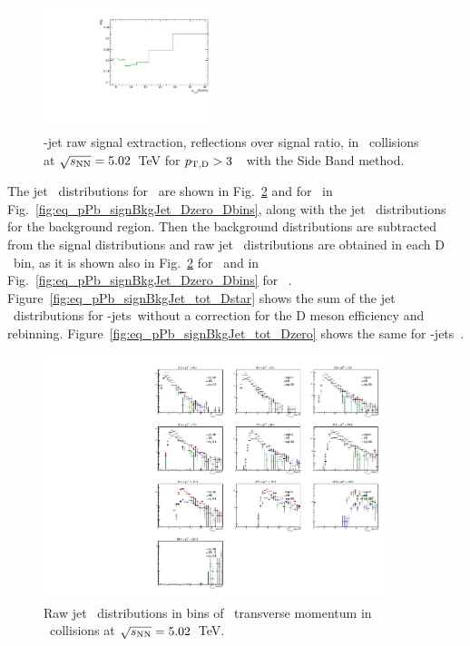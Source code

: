 \begin{figure}[bth]
\centering
\includegraphics[width=0.45\textwidth]{pPbplotsD0/Default/signalExtraction/plots/RefOverS_LHC16R03_pTD3.pdf}
\caption{\Dzero-jet raw signal extraction, reflections over signal ratio, in \pPb\ collisions at $\sqrt{s_{\rm NN}}=5.02$~TeV for $p_{\mathrm{T,D}}>3$~\GeVc\ with the Side Band method.}
\label{fig:eq_pPb_RSU_raw_Dbins_Refl_Dzero}
\end{figure}

The jet \pt\ distributions for \Dstar\ are shown in Fig.~\ref{fig:eq_pPb_signBkgJet_Dstar_Dbins} and for \Dzero\ in Fig.~\ref{fig:eq_pPb_signBkgJet_Dzero_Dbins}, 
along with the jet \pt\ distributions for the background region. 
Then the background distributions are subtracted from the signal distributions and raw jet \pt\ distributions are obtained in each D \pt\ bin, 
as it is shown also in Fig.~\ref{fig:eq_pPb_signBkgJet_Dstar_Dbins} for \Dstar\ and in Fig.~\ref{fig:eq_pPb_signBkgJet_Dzero_Dbins} for \Dzero\ .
Figure~\ref{fig:eq_pPb_signBkgJet_tot_Dstar} shows the sum of the jet \pt\ distributions for \Dstar-jets\ without a correction for the D meson efficiency and rebinning.
Figure~\ref{fig:eq_pPb_signBkgJet_tot_Dzero} shows the same for \Dzero-jets\ .

\begin{figure}[bth]
\centering
\includegraphics[width=0.9\textwidth]{pPbplots/plotsSB_noEff_pt3_noDetails/jetRawSpectrumFASTwoSDD_pTD3}
\caption{Raw jet \pt\ distributions in bins of \Dstar\ transverse momentum in \pPb\ collisions at $\sqrt{s_{\rm NN}}=5.02$~TeV.}
\label{fig:eq_pPb_signBkgJet_Dstar_Dbins}
\end{figure}


